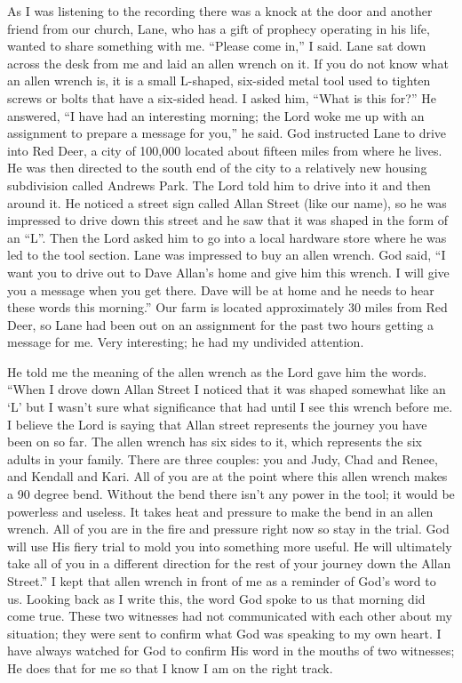 \documentclass[oneside]{book}
\begin{document}
As I was listening to the recording there was a knock at the door and another friend from our church, Lane, who has a gift of prophecy operating in his life, wanted to share something with me. “Please come in,” I said. Lane sat down across the desk from me and laid an allen wrench on it. If you do not know what an allen wrench is, it is a small L-shaped, six-sided metal tool used to tighten screws or bolts that have a six-sided head. I asked him, “What is this for?” He answered, “I have had an interesting morning; the Lord woke me up with an assignment to prepare a message for you,” he said. God instructed Lane to drive into Red Deer, a city of 100,000 located about fifteen miles from where he lives. He was then directed to the south end of the city to a relatively new housing subdivision called Andrews Park. The Lord told him to drive into it and then around it. He noticed a street sign called Allan Street (like our name), so he was impressed to drive down this street and he saw that it was shaped in the form of an “L”. Then the Lord asked him to go into a local hardware store where he was led to the tool section. Lane was impressed to buy an allen wrench. God said, “I want you to drive out to Dave Allan's home and give him this wrench. I will give you a message when you get there. Dave will be at home and he needs to hear these words this morning.” Our farm is located approximately 30 miles from Red Deer, so Lane had been out on an assignment for the past two hours getting a message for me. Very interesting; he had my undivided attention. 


He told me the meaning of the allen wrench as the Lord gave him the words. “When I drove down Allan Street I noticed that it was shaped somewhat like an ‘L’ but I wasn't sure what significance that had until I see this wrench before me. I believe the Lord is saying that Allan street represents the journey you have been on so far. The allen wrench has six sides to it, which represents the six adults in your family. There are three couples: you and Judy, Chad and Renee, and Kendall and Kari. All of you are at the point where this allen wrench makes a 90 degree bend. Without the bend there isn’t any power in the tool; it would be powerless and useless. It takes heat and pressure to make the bend in an allen wrench. All of you are in the fire and pressure right now so stay in the trial. God will use His fiery trial to mold you into something more useful. He will ultimately take all of you in a different direction for the rest of your journey down the Allan Street.” I kept that allen wrench in front of me as a reminder of God's word to us. Looking back as I write this, the word God spoke to us that morning did come true. These two witnesses had not communicated with each other about my situation; they were sent to confirm what God was speaking to my own heart. I have always watched for God to confirm His word in the mouths of two witnesses; He does that for me so that I know I am on the right track.
\end{document}
